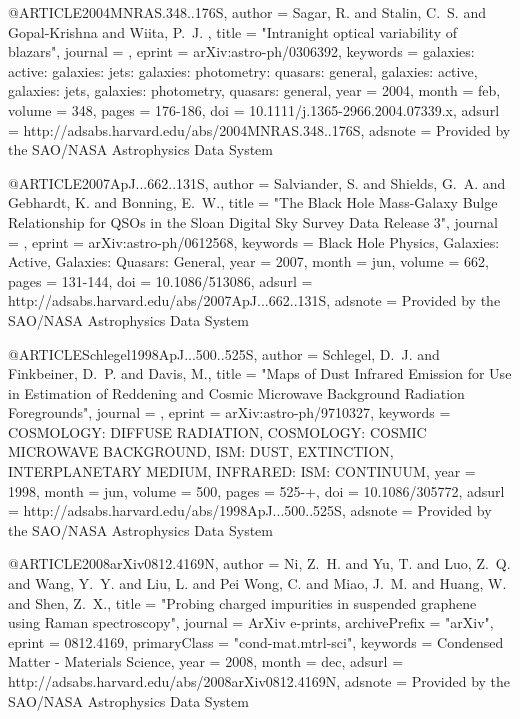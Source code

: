 \documentclass[twocolumn]{aastex62}
\begin{document}
{{{{{ 
@ARTICLE{2004MNRAS.348..176S,
   author = {{Sagar}, R. and {Stalin}, C.~S. and {Gopal-Krishna} and {Wiita}, P.~J.
	},
    title = "{Intranight optical variability of blazars}",
  journal = {\mnras},
   eprint = {arXiv:astro-ph/0306392},
 keywords = {galaxies: active: galaxies: jets: galaxies: photometry: quasars: general, galaxies: active, galaxies: jets, galaxies: photometry, quasars: general},
     year = 2004,
    month = feb,
   volume = 348,
    pages = {176-186},
      doi = {10.1111/j.1365-2966.2004.07339.x},
   adsurl = {http://adsabs.harvard.edu/abs/2004MNRAS.348..176S},
  adsnote = {Provided by the SAO/NASA Astrophysics Data System}
}


@ARTICLE{2007ApJ...662..131S,
   author = {{Salviander}, S. and {Shields}, G.~A. and {Gebhardt}, K. and 
	{Bonning}, E.~W.},
    title = "{The Black Hole Mass-Galaxy Bulge Relationship for QSOs in the Sloan Digital Sky Survey Data Release 3}",
  journal = {\apj},
   eprint = {arXiv:astro-ph/0612568},
 keywords = {Black Hole Physics, Galaxies: Active, Galaxies: Quasars: General},
     year = 2007,
    month = jun,
   volume = 662,
    pages = {131-144},
      doi = {10.1086/513086},
   adsurl = {http://adsabs.harvard.edu/abs/2007ApJ...662..131S},
  adsnote = {Provided by the SAO/NASA Astrophysics Data System}
}



@ARTICLE{Schlegel1998ApJ...500..525S,
   author = {{Schlegel}, D.~J. and {Finkbeiner}, D.~P. and {Davis}, M.},
    title = "{Maps of Dust Infrared Emission for Use in Estimation of Reddening and Cosmic Microwave Background Radiation Foregrounds}",
  journal = {\apj},
   eprint = {arXiv:astro-ph/9710327},
 keywords = {COSMOLOGY: DIFFUSE RADIATION, COSMOLOGY: COSMIC MICROWAVE BACKGROUND, ISM: DUST, EXTINCTION, INTERPLANETARY MEDIUM, INFRARED: ISM: CONTINUUM},
     year = 1998,
    month = jun,
   volume = 500,
    pages = {525-+},
      doi = {10.1086/305772},
   adsurl = {http://adsabs.harvard.edu/abs/1998ApJ...500..525S},
  adsnote = {Provided by the SAO/NASA Astrophysics Data System}
}


@ARTICLE{2008arXiv0812.4169N,
   author = {{Ni}, Z.~H. and {Yu}, T. and {Luo}, Z.~Q. and {Wang}, Y.~Y. and 
	{Liu}, L. and {Pei Wong}, C. and {Miao}, J.~M. and {Huang}, W. and 
	{Shen}, Z.~X.},
    title = "{Probing charged impurities in suspended graphene using Raman spectroscopy}",
  journal = {ArXiv e-prints},
archivePrefix = "arXiv",
   eprint = {0812.4169},
 primaryClass = "cond-mat.mtrl-sci",
 keywords = {Condensed Matter - Materials Science},
     year = 2008,
    month = dec,
   adsurl = {http://adsabs.harvard.edu/abs/2008arXiv0812.4169N},
  adsnote = {Provided by the SAO/NASA Astrophysics Data System}
}


}}}}}
\end{document}
